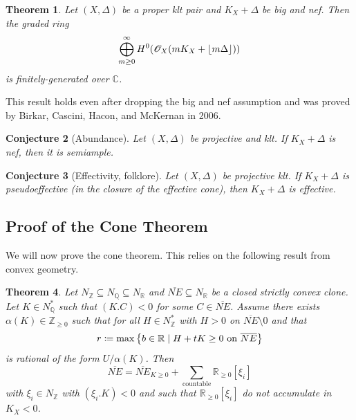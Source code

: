 \documentclass[leqno, openany]{memoir}
\DeclarePairedDelimiter{\floor}{\lfloor}{\rfloor}
\newtheorem{thm}{Theorem}[section]
\newtheorem{conj}[thm]{Conjecture}
\theoremstyle{definition}
\theoremstyle{remark}
\theoremstyle{plain}
\theoremstyle{definition}
\theoremstyle{remark}
\newcommand{\R}{\mathbb{R}}
\newcommand{\C}{\mathbb{C}}
\newcommand{\Z}{\mathbb{Z}}
\newcommand{\Q}{\mathbb{Q}}
\newcommand{\msc}[1]{\mathscr{#1}}
\newcommand{\ol}[1]{\overline{#1}}
\begin{document}
\begin{thm}
    Let $(X, \Delta)$ be a proper klt pair and $K_X + \Delta$ be big and nef. Then the graded ring
    \[ \bigoplus_{m \geq 0}^{\infty} H^0(\msc{O}_X (m K_X + \floor{m \Delta})) \]
    is finitely-generated over $\C$.
\end{thm}

This result holds even after dropping the big and nef assumption and was proved by Birkar, Cascini, Hacon, and McKernan in 2006.

\begin{conj}[Abundance]
    Let $(X, \Delta)$ be projective and klt. If $K_X + \Delta$ is nef, then it is semiample.
\end{conj}

\begin{conj}[Effectivity, folklore]
    Let $(X, \Delta)$ be projective klt. If $K_X + \Delta$ is pseudoeffective (in the closure of the effective cone), then $K_X + \Delta$ is effective.
\end{conj}

\subsection{Proof of the Cone Theorem}%
\label{sub:proof_of_the_cone_theorem}

We will now prove the cone theorem. This relies on the following result from convex geometry.

\begin{thm}
    Let $N_{\Z} \subseteq N_{\Q} \subseteq N_{\R}$ and $\ol{NE} \subseteq N_{\R}$ be a closed strictly convex clone. Let $K \in N_{\Q}^*$ such that $(K.C) < 0$ for some $C \in \ol{NE}$. Assume there exists $\alpha(K) \in \Z_{\geq 0}$ such that for all $H \in N_{\Z}^*$ with $H > 0$ on $\ol{NE} \setminus \qty{0}$ and that
    \[ r \coloneqq \max \qty{b \in \R \mid H + tK \geq 0\ \text{on}\ \ol{NE}} \]
    is rational of the form $U/\alpha(K)$. Then
    \[ \ol{NE} = \ol{NE}_{K \geq 0} + \sum_{\text{countable}} \R_{\geq 0} [\xi_i] \]
    with $\xi_i \in N_{\Z}$ with $(\xi_i.K) < 0$ and such that $\R_{\geq 0} [\xi_i]$ do not accumulate in $K_X < 0$.
\end{thm}
\end{document}
